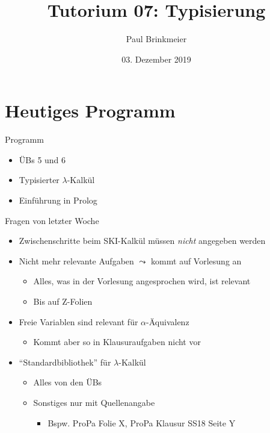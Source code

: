 \documentclass{beamer}
\title{Tutorium 07: Typisierung}
\author{Paul Brinkmeier}
\institute{Tutorium Programmierparadigmen am KIT}
\date{03. Dezember 2019}
\begin{document}
\begin{frame}
	\titlepage
\end{frame}

\section{Heutiges Programm}

\begin{frame}{Programm}
	\begin{itemize}
		\item ÜBs 5 und 6
		\item Typisierter $\lambda$-Kalkül
		\item Einführung in Prolog
	\end{itemize}
\end{frame}

\begin{frame}{Fragen von letzter Woche}
	\begin{itemize}
		\item Zwischenschritte beim SKI-Kalkül müssen \emph{nicht} angegeben werden
		\pause
		\item Nicht mehr relevante Aufgaben $\leadsto$ kommt auf Vorlesung an
		\begin{itemize}
			\item Alles, was in der Vorlesung angesprochen wird, ist relevant
			\pause
			\item Bis auf Z-Folien
		\end{itemize}
		\pause
		\item Freie Variablen sind relevant für $\alpha$-Äquivalenz
		\begin{itemize}
			\item Kommt aber so in Klausuraufgaben nicht vor
		\end{itemize}
		\pause
		\item \enquote{Standardbibliothek} für $\lambda$-Kalkül
		\begin{itemize}
			\item Alles von den ÜBs
			\item Sonstiges nur mit Quellenangabe
			\begin{itemize}
				\item Bspw. ProPa Folie X, ProPa Klausur SS18 Seite Y
			\end{itemize}
		\end{itemize}
	\end{itemize}
\end{frame}

\newcommand{\aeq}{\stackrel{\alpha}{=}}
\newcommand{\naeq}{\stackrel{\alpha}{\neq}}
\newcommand{\eeq}{\stackrel{\eta}{=}}
\end{document}
